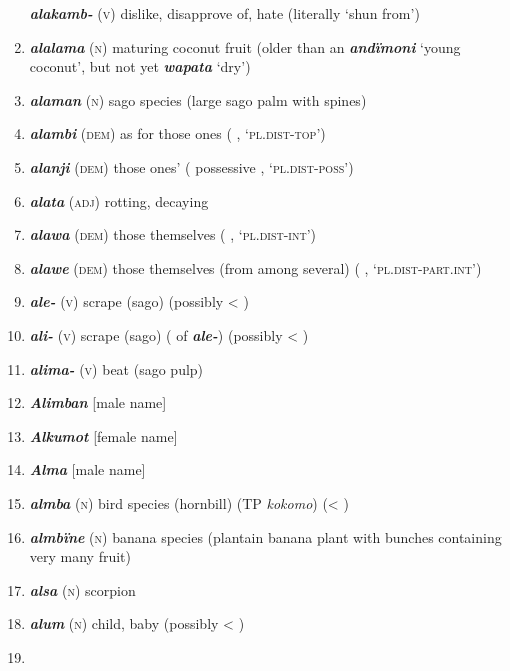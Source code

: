 \begin{enumerate}[noitemsep, label={}, align=left, widest=190, labelsep=1ex,leftmargin=*,itemindent=-10pt]
\textbf{\textit{alakamb-}} (\textsc{v}) dislike, disapprove of, hate (literally ‘shun from’) \item 
\textbf{\textit{alalama}} (\textsc{n}) maturing coconut fruit (older than an \textbf{\textit{andïmoni}} ‘young coconut’, but not yet \textbf{\textit{wapata}} ‘dry’) \item 
\textbf{\textit{alaman}} (\textsc{n}) sago species (large sago palm with spines) \item 
\textbf{\textit{alambi}} (\textsc{dem}) as for those ones (   , \linebreak‘\textsc{pl.dist-top}’) \item 
\textbf{\textit{alanji}} (\textsc{dem}) those ones’ (  possessive , ‘\textsc{pl.dist-poss}’) \item 
\textbf{\textit{alata}} (\textsc{adj}) rotting, decaying \item 
\textbf{\textit{alawa}} (\textsc{dem}) those themselves (   , \linebreak ‘\textsc{pl.dist-int}’) \item 
\textbf{\textit{alawe}} (\textsc{dem}) those themselves (from among several) (  \linebreak {} , ‘\textsc{pl.dist-part.int}’) \item 
\textbf{\textit{ale-}} (\textsc{v}) scrape (sago) (possibly < ) \item 
\textbf{\textit{ali-}} (\textsc{v}) scrape (sago) (  of \textbf{\textit{ale-}}) (possibly < ) \item 
\textbf{\textit{alima-}} (\textsc{v}) beat (sago pulp) \item 
\textbf{\textit{Alimban}} [male name] \item 
\textbf{\textit{Alkumot}} [female name] \item 
\textbf{\textit{Alma}} [male name] \item 
\textbf{\textit{almba}} (\textsc{n}) bird species (hornbill) (TP \textit{kokomo}) (< ) \item 
\textbf{\textit{almbïne}} (\textsc{n}) banana species (plantain banana plant with bunches containing very many fruit) \item 
\textbf{\textit{alsa}} (\textsc{n}) scorpion \item 
\textbf{\textit{alum}} (\textsc{n}) child, baby (possibly < ) \item 

\end{enumerate}
